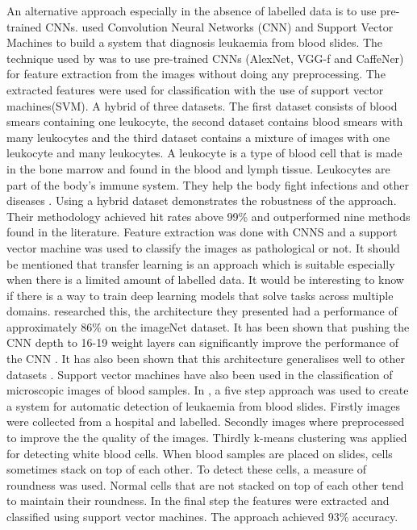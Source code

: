 \documentclass[a4paper,11pt]{article}
\begin{document}
An alternative approach especially in the absence of labelled data is to use pre-trained CNNs.
\cite{Luis} used Convolution Neural Networks (CNN) and Support Vector Machines to build a system that diagnosis leukaemia from blood slides. The technique used by \cite{Luis} was to use pre-trained CNNs (AlexNet, VGG-f and CaffeNer) for feature extraction from the images without doing any preprocessing. The extracted features were used for classification with the use of support vector machines(SVM). A hybrid of three datasets. The first dataset consists of blood smears containing one leukocyte, the second dataset contains blood smears with many leukocytes and the third dataset contains a mixture of images with one leukocyte and many leukocytes. A leukocyte  is a type of blood cell that is made in the bone marrow and found in the blood and lymph tissue. Leukocytes are part of the body's immune system. They help the body fight infections and other diseases \citep{Greaves}. Using a hybrid dataset demonstrates the robustness of the approach. Their methodology achieved hit rates above 99\% and outperformed nine methods found in the literature. Feature extraction was done with CNNS and a support vector machine was used to classify the images as pathological or not. It should be mentioned that transfer learning is an approach which is suitable especially when there is a limited amount of labelled data. It would be interesting to know if there is a way to train deep learning models that solve tasks across multiple domains. \cite{Kaiser} researched  this, the architecture they presented had a performance of approximately 86\% on the imageNet dataset.
It has been shown that pushing the CNN depth to 16-19 weight layers can significantly improve the performance of the CNN . It has also been shown that this architecture generalises well to other datasets \citep{simonyan2015deep}. Support vector machines have also been used in the classification of microscopic images of blood samples. In \cite{Nimesh}, a five step approach was used to create a system for automatic detection of leukaemia from blood slides. Firstly images were collected from a hospital and labelled. Secondly images where preprocessed to improve the the quality of the images. Thirdly k-means clustering was applied for detecting white blood cells. When blood samples are placed on slides, cells sometimes stack on top of each other. To detect these cells, a measure of roundness was used. Normal cells that are not stacked on top of each other tend to maintain their roundness. In the final step the features were extracted and classified using support vector machines. The approach achieved 93\% accuracy. 
\end{document}
